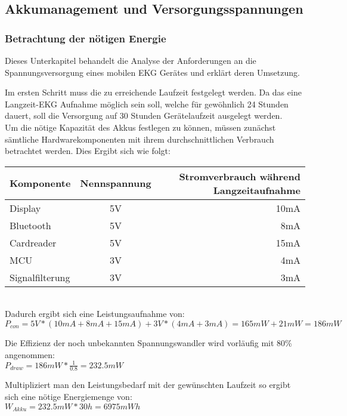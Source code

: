 
\setlength{\parindent}{0em} 

\subsection{Akkumanagement und Versorgungsspannungen}

\subsubsection{Betrachtung der nötigen Energie}

Dieses Unterkapitel behandelt die Analyse der Anforderungen an die Spannungsversorgung eines mobilen EKG Gerätes und erklärt deren Umsetzung.

Im ersten Schritt muss die zu erreichende Laufzeit festgelegt werden. Da das eine Langzeit-EKG Aufnahme möglich sein soll, welche für gewöhnlich 24 Stunden dauert, soll die Versorgung auf 30 Stunden Gerätelaufzeit ausgelegt werden. \\

Um die nötige Kapazität des Akkus festlegen zu können, müssen zunächst sämtliche Hardwarekomponenten mit ihrem durchschnittlichen Verbrauch betrachtet werden. Dies Ergibt sich wie folgt:
\\

\begin{tabular}[h]{l|c|r}
Komponente & Nennspannung & Stromverbrauch während Langzeitaufnahme\\
\hline
Display & 5V & 10mA \\
Bluetooth & 5V & 8mA \\
Cardreader & 5V & 15mA \\
MCU & 3V & 4mA \\
Signalfilterung & 3V & 3mA \\
\end{tabular}
\\
Dadurch ergibt sich eine Leistungsaufnahme von:\\
$ P_{con} = 5V * (10mA + 8mA + 15mA) + 3V * (4mA + 3mA) = 165mW + 21mW = 186mW $

Die Effizienz der noch unbekannten Spannungswandler wird vorläufig mit 80\% angenommen:\\
$P_{draw} = 186mW * \frac{1}{0.8} = 232.5mW $

Multipliziert man den Leistungsbedarf mit der gewünschten Laufzeit so ergibt sich eine nötige Energiemenge von:\\
$W_{Akku} = 232.5mW * 30h = 6975mWh$

